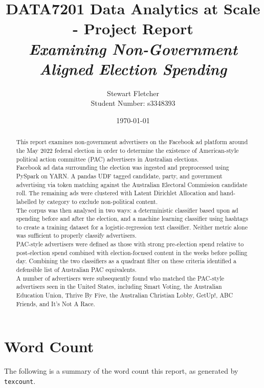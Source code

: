 \documentclass[11pt,a4paper]{article}
\title{DATA7201 Data Analytics at Scale - Project Report\\
\small \emph{Examining Non-Government Aligned Election Spending}}
\author{Stewart Fletcher \\ Student Number: s3348393}
\date{\today}
\begin{document}
\maketitle

\begin{abstract}
\noindent This report examines non-government advertisers on the Facebook ad platform around the May 2022 federal election in order to determine the existence of American-style political action committee (PAC) advertisers in Australian elections. \\

Facebook ad data surrounding the election was ingested and preprocessed using PySpark on YARN. A pandas UDF tagged candidate, party, and government advertising via token matching against the Australian Electoral Commission candidate roll. The remaining ads were clustered with Latent Dirichlet Allocation and hand-labelled by category to exclude non-political content. \\

The corpus was then analysed in two ways: a deterministic classifier based upon ad spending before and after the election, and a machine learning classifier using hashtags to create a training dataset for a logistic-regression text classifier. Neither metric alone was sufficient to properly classify advertisers. \\

PAC-style advertisers were defined as those with strong pre-election spend relative to post-election spend combined with election-focused content in the weeks before polling day. Combining the two classifiers as a quadrant filter on these criteria identified a defensible list of Australian PAC equivalents. \\

A number of advertisers were subsequently found who matched the PAC-style advertisers seen in the United States, including Smart Voting, the Australian Education Union, Thrive By Five, the Australian Christian Lobby, GetUp!, ABC Friends, and It's Not A Race.
\end{abstract}

\newpage
\tableofcontents
\newpage

\section*{Word Count}

The following is a summary of the word count this report, as generated by \texttt{texcount}.
\end{document}
